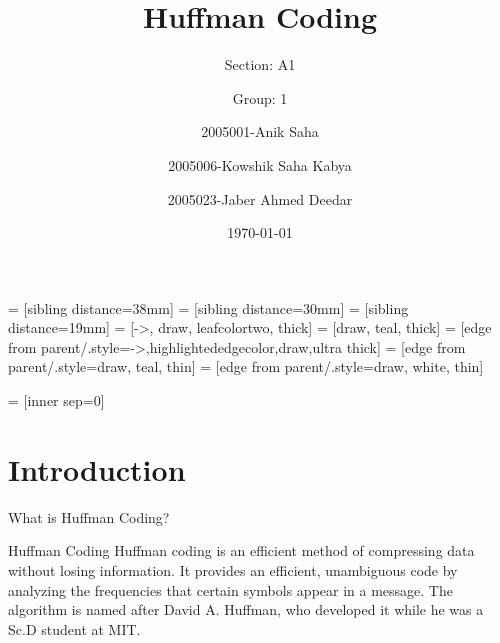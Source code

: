 \documentclass{beamer}
\title{Huffman Coding}
\author[Anik \and Kowshik \and Jaber]{
	Section: A1 \\\and
	Group: 1\\ \and
	2005001-Anik Saha\\ \and 
	2005006-Kowshik Saha Kabya\\ \and 
	2005023-Jaber Ahmed Deedar}
\institute[CSE, BUET]{
	Department of CSE\\ 
	Bangladesh University of Engineering and Technology
}
\date{\today}
\begin{document}
\maketitle
	
	
	
	 = [sibling distance=38mm]
	 = [sibling distance=30mm]
	 = [sibling distance=19mm]
	 = [->, draw, leafcolortwo, thick]
	 = [draw, teal, thick]
	 = [edge from parent/.style={->,highlightededgecolor,draw,ultra thick}]
	 = [edge from parent/.style={draw, teal, thin}]
	 = [edge from parent/.style={draw, white, thin}]
	
	 = [inner sep=0]
	
	\section{Introduction}
	
	\begin{frame}{What is Huffman Coding?}
		\begin{block}{Huffman Coding}
			Huffman coding is an efficient method of compressing data without losing information. 
			It provides an efficient, unambiguous code by analyzing the frequencies that certain symbols appear in a message. The algorithm is named after David A. Huffman, who developed it while he was a Sc.D student at MIT.
		\end{block}
	\end{frame}
	
\end{document}
